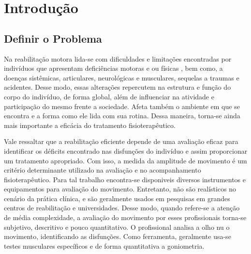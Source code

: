 \chapter*[Introdução]{Introdução}

\section{Definir o Problema}       
\label{Sec:DefinirProblema}

  Na reabilitação motora lida-se com dificuldades e limitações encontradas por 
indivíduos que apresentam deficiências motoras e ou físicas , bem como, 
 a doenças sistêmicas, articulares, neurológicas e musculares, sequelas a 
traumas e acidentes.  Desse modo, essas alterações repercutem 
 na estrutura e função do corpo do indivíduo, de forma global, além de
influenciar na atividade e participação do mesmo frente a sociedade. Afeta 
também o ambiente em que se encontra e a forma como ele lida com sua rotina. 
Dessa maneira, torna-se ainda mais importante a eficácia do tratamento 
fisioterapêutico.
                                                                                 
  Vale ressaltar que  a reabilitação eficiente depende de uma avaliação eficaz
 para identificar os déficits encontrado nas disfunções do indivíduo e assim 
proporcionar um tratamento apropriado. Com isso, a medida da amplitude de 
movimento é  um critério determinante utilizado na avaliação e no 
acompanhamento fisioterapêutico. Para tal trabalho encontra-se disponiveis 
diversos instrumentos e equipamentos para avaliação do movimento. Entretanto, 
não são realísticos no cenário da prática clínica, e são geralmente usados em 
pesquisas em grandes centros de reabilitação e universidades. Desse modo, 
quando refere-se a atenção de média complexidade, a avaliação do movimento por 
esses profissionais torna-se subjetivo, descritivo e pouco 
quantitativo. O profissional analisa a olho nu o movimento, identificando as 
disfunções. Como ferramenta, geralmente usa-se testes musculares específicos e 
de forma quantitativa a goniometria.

